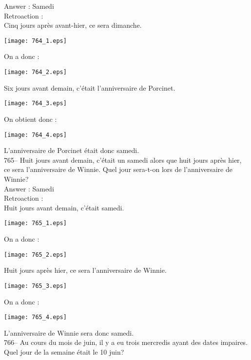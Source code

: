 ﻿\documentclass[letterpaper, 12pt]{article}
\begin{document}
Answer : Samedi\\

Retroaction : \\
Cinq jours apr\`es avant-hier, ce sera dimanche.\\
\begin{center}
\texttt{[image: 764\_1.eps]}
\end{center}
On a donc :\\
\begin{center}
\texttt{[image: 764\_2.eps]}
\end{center}
Six jours avant demain, c'\'etait l'anniversaire de Porcinet.\\
\begin{center}
\texttt{[image: 764\_3.eps]}
\end{center}
On obtient donc :
\begin{center}
\texttt{[image: 764\_4.eps]}
\end{center}
L'anniversaire de Porcinet \'etait donc samedi.\\

765-- Huit jours avant demain, c'\'etait un samedi alors que huit jours
apr\`es hier, ce sera l'anniversaire de Winnie.  Quel jour sera-t-on lors de
l'anniversaire de Winnie?\\

Answer : Samedi\\

Retroaction : \\
Huit jours avant demain, c'\'etait samedi.\\
\begin{center}
\texttt{[image: 765\_1.eps]}
\end{center}
On a donc :\\\begin{center}
\texttt{[image: 765\_2.eps]}
\end{center}
Huit jours apr\`es hier, ce sera l'anniversaire de Winnie.\\
\begin{center}
\texttt{[image: 765\_3.eps]}
\end{center}
On a donc :\\
\begin{center}
\texttt{[image: 765\_4.eps]}
\end{center}
L'anniversaire de Winnie sera donc samedi.\\

766-- Au cours du mois de juin, il y a eu trois mercredis ayant des dates
impaires.  Quel jour de la semaine \'etait le 10 juin?\\
\end{document}
